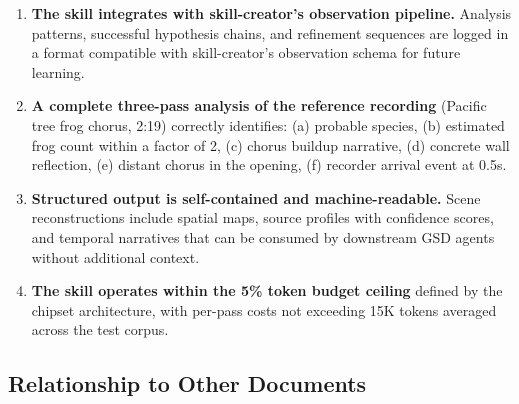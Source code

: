 \documentclass[11pt,letterpaper]{article}
\begin{document}
\begin{enumerate}[leftmargin=2em]
\item \textbf{The skill integrates with skill-creator's observation pipeline.} Analysis patterns, successful hypothesis chains, and refinement sequences are logged in a format compatible with skill-creator's observation schema for future learning.

\item \textbf{A complete three-pass analysis of the reference recording} (Pacific tree frog chorus, 2:19) correctly identifies: (a) probable species, (b) estimated frog count within a factor of 2, (c) chorus buildup narrative, (d) concrete wall reflection, (e) distant chorus in the opening, (f) recorder arrival event at 0.5s.

\item \textbf{Structured output is self-contained and machine-readable.} Scene reconstructions include spatial maps, source profiles with confidence scores, and temporal narratives that can be consumed by downstream GSD agents without additional context.

\item \textbf{The skill operates within the 5\% token budget ceiling} defined by the chipset architecture, with per-pass costs not exceeding 15K tokens averaged across the test corpus.
\end{enumerate}

\subsection{Relationship to Other Documents}
\end{document}
